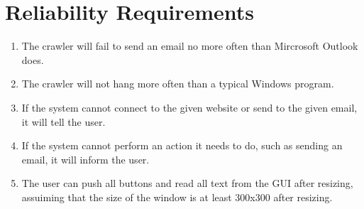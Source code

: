 \section{Reliability Requirements}
\begin{enumerate}
\item The crawler will fail to send an email no more often than Mircrosoft Outlook does.\\
\item The crawler will not hang more often than a typical Windows program.\\
\item If the system cannot connect to the given website or send to the given email, it will tell the user.\\
\item If the system cannot perform an action it needs to do, such as sending an email, it will inform the user.\\
\item The user can push all buttons and read all text from the GUI after resizing, assuiming that the size of the window is at least 300x300 after resizing.\\
\end{enumerate}
